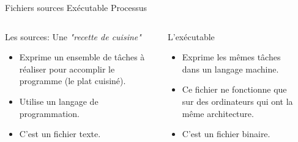 \begin{frame}{Fichiers sources \textrightarrow Exécutable
    \textrightarrow Processus}

  \begin{columns}
    \begin{column}{3.8cm}
      \begin{block}{Les sources: Une \textit{"recette de cuisine"}}
        \begin{itemize}
        \item Exprime un ensemble de tâches à réaliser pour accomplir le
          programme (le plat cuisiné).
        \item Utilise un langage de programmation.
        \item C'est un fichier texte.
        \end{itemize}
      \end{block}
    \end{column}
    \begin{column}{3.8cm}
      \begin{block}{L'exécutable}
        \begin{itemize}
        \item Exprime les mêmes tâches dans un langage machine.
        \item Ce fichier ne fonctionne que sur des ordinateurs qui ont
          la même architecture.
        \item C'est un fichier binaire.
        \end{itemize}
      \end{block}
      \vfill {}
    \end{column}
    \begin{column}{3.8cm}

\end{column}
\end{columns}
\end{frame}
